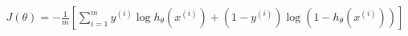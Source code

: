 \documentclass[preview]{standalone}
\begin{document}
\begin{align*}
J(\theta) = -\frac{1}{m} [\sum_{i=1}^{m} y^{(i)} \log{h_{\theta}(x^{(i)})} + (1-y^{(i)}) \log{(1-h_{\theta}(x^{(i)}))}]
\end{align*}
\end{document}
